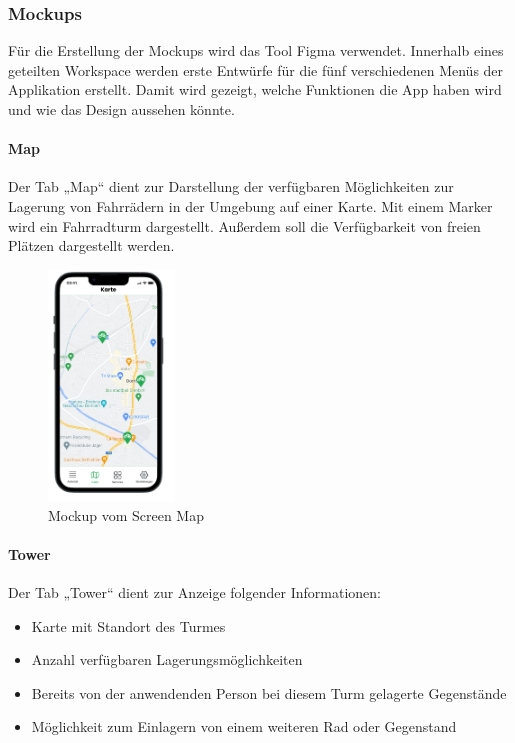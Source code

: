 \subsubsection{Mockups}
Für die Erstellung der \Gls{Mockup}s wird das Tool Figma verwendet. Innerhalb eines geteilten Workspace werden erste Entwürfe für die fünf verschiedenen Menüs der Applikation erstellt. Damit wird gezeigt, welche Funktionen die App haben wird und wie das Design aussehen könnte.

\bigskip


\paragraph{Map}Der \Gls{Tab} „Map“ dient zur Darstellung der verfügbaren Möglichkeiten zur Lagerung von Fahrrädern in der Umgebung auf einer Karte. Mit einem Marker wird ein Fahrradturm dargestellt. Außerdem soll die Verfügbarkeit von freien Plätzen dargestellt werden.

\begin{figure}[H]
  \centering
  \includegraphics[width=0.3\textwidth]{images/app_mock_map}
  \caption{\Gls{Mockup} vom Screen Map}
  \label{fig:screenmapmock}
\end{figure}

\bigskip


\paragraph{Tower}Der \Gls{Tab} „Tower“ dient zur Anzeige folgender Informationen:

\begin{itemize}
  \item Karte mit Standort des Turmes
  \item Anzahl verfügbaren Lagerungsmöglichkeiten
  \item Bereits von der anwendenden Person bei diesem Turm gelagerte Gegenstände
  \item Möglichkeit zum Einlagern von einem weiteren Rad oder Gegenstand
\end{itemize}

